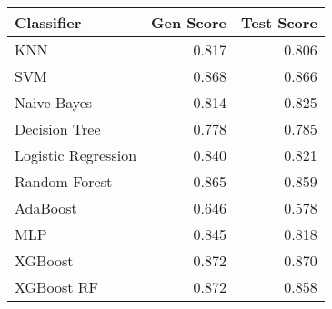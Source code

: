 \begin{tabular}{lrr}
\toprule
Classifier & Gen Score & Test Score \\
\midrule
KNN & 0.817 & 0.806 \\
SVM & 0.868 & 0.866 \\
Naive Bayes & 0.814 & 0.825 \\
Decision Tree & 0.778 & 0.785 \\
Logistic Regression & 0.840 & 0.821 \\
Random Forest & 0.865 & 0.859 \\
AdaBoost & 0.646 & 0.578 \\
MLP & 0.845 & 0.818 \\
XGBoost & 0.872 & 0.870 \\
XGBoost RF & 0.872 & 0.858 \\
\bottomrule
\end{tabular}
